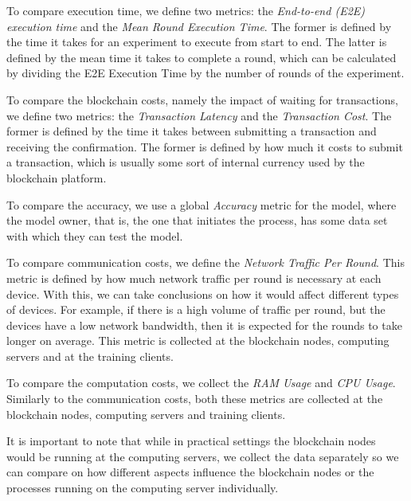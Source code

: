 To compare execution time, we define two metrics: the \textit{End-to-end (E2E) execution time} and the \textit{Mean Round Execution Time}. The former is defined by the time it takes for an experiment to execute from start to end. The latter is defined by the mean time it takes to complete a round, which can be calculated by dividing the E2E Execution Time by the number of rounds of the experiment.

To compare the blockchain costs, namely the impact of waiting for transactions, we define two metrics: the \textit{Transaction Latency} and the \textit{Transaction Cost}. The former is defined by the time it takes between submitting a transaction and receiving the confirmation. The former is defined by how much it costs to submit a transaction, which is usually some sort of internal currency used by the blockchain platform.

To compare the accuracy, we use a global \textit{Accuracy} metric for the model, where the model owner, that is, the one that initiates the process, has some data set with which they can test the model.

To compare communication costs, we define the \textit{Network Traffic Per Round}. This metric is defined by how much network traffic per round is necessary at each device. With this, we can take conclusions on how it would affect different types of devices. For example, if there is a high volume of traffic per round, but the devices have a low network bandwidth, then it is expected for the rounds to take longer on average. This metric is collected at the blockchain nodes, computing servers and at the training clients.

To compare the computation costs, we collect the \textit{RAM Usage} and \textit{CPU Usage}. Similarly to the communication costs, both these metrics are collected at the blockchain nodes, computing servers and training clients.

It is important to note that while in practical settings the blockchain nodes would be running at the computing servers, we collect the data separately so we can compare on how different aspects influence the blockchain nodes or the processes running on the computing server individually.
